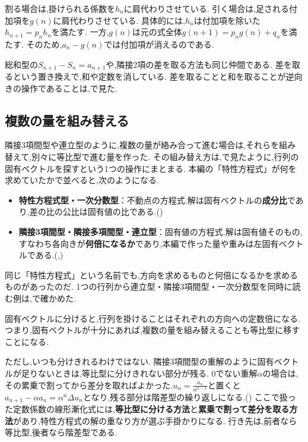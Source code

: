 割る場合は,掛けられる係数を$h_n$に肩代わりさせている.
引く場合は,足される付加項を$g(n)$に肩代わりさせている.
具体的には,$h_n$は付加項を除いた$h_{n+1}=p_nh_n$を満たす.
一方,$g(n)$は元の式全体$g(n+1)=p_ng(n)+q_n$を満たす.
そのため,$a_n-g(n)$では付加項が消えるのである.

総和型の$S_{n+1}-S_n=a_{n+1}$や,隣接2項の差を取る方法も同じ仲間である.
差を取るという置き換えで,和や定数を消している.
差を取ることと和を取ることが逆向きの操作であることは,で見た.

\subsection{複数の量を組み替える}\label{節：複数の量を組み替える}

隣接3項間型や連立型のように,複数の量が絡み合って進む場合は,それらを組み替えて,別々に等比型で進む量を作った.
その組み替え方は,で見たように,行列の固有ベクトルを探すという1つの操作にまとまる.
本編の「特性方程式」が何を求めていたかで並べると,次のようになる.
\begin{itemize}
  \item \textbf{特性方程式型・一次分数型}：不動点の方程式.解は固有ベクトルの\textbf{成分比}であり,差の比の公比は固有値の比である.()
  \item \textbf{隣接3項間型・隣接多項間型・連立型}：固有値の方程式.解は固有値そのもの,すなわち各向きが\textbf{何倍になるか}であり,本編で作った量や重みは左固有ベクトルである.(,)
\end{itemize}
同じ「特性方程式」という名前でも,方向を求めるものと何倍になるかを求めるものがあったのだ.
1つの行列から連立型・隣接3項間型・一次分数型を同時に読む例は,で確かめた.

固有ベクトルに分けると,行列を掛けることはそれぞれの方向への定数倍になる.
つまり,固有ベクトルが十分にあれば,複数の量を組み替えることも等比型に移すことになる.

ただし,いつも分けきれるわけではない.
隣接3項間型の重解のように固有ベクトルが足りないときは,等比型に分けきれない部分が残る.
0でない重解$\alpha$の場合は,その累乗で割ってから差分を取ればよかった.$u_n=\frac{a_n}{\alpha^{n-1}}$と置くと$a_{n+1}-\alpha a_n=\alpha^n\Delta u_n$となり,残る部分は階差型の繰り返しになる.()
ここで扱った定数係数の線形漸化式には,\textbf{等比型に分ける方法}と\textbf{累乗で割って差分を取る方法}があり,特性方程式の解の重なり方が選ぶ手掛かりになる.
行き先は,前者なら等比型,後者なら階差型である.

